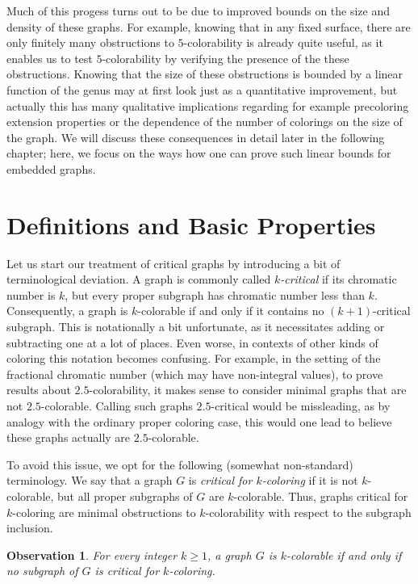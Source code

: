 \documentclass[12pt,twoside,openright,a4paper]{book}
\newtheorem{observation}[theorem]{Observation}
\begin{document}
Much of this progess turns out to be due to improved bounds
on the size and density of these graphs.  For example, knowing that in any
fixed surface, there are only finitely many obstructions to $5$-colorability
is already quite useful, as it enables us to test $5$-colorability by verifying the
presence of the these obstructions.  Knowing that the size of these obstructions
is bounded by a linear function of the genus may at first look just as a quantitative improvement,
but actually this has many qualitative implications regarding for example precoloring extension
properties or the dependence of the number of colorings on the size of the graph.
We will discuss these consequences in detail later in the following chapter;
here, we focus on the ways how one can prove such linear bounds for embedded graphs.

\section{Definitions and Basic Properties}

Let us start our treatment of critical graphs by introducing a bit of terminological
deviation.  A graph is commonly called \emph{$k$-critical} if its chromatic number is $k$, but every
proper subgraph has chromatic number less than $k$.  Consequently, a graph is $k$-colorable
if and only if it contains no $(k+1)$-critical subgraph.  This is notationally a bit unfortunate,
as it necessitates adding or subtracting one at a lot of places.  Even worse, in contexts
of other kinds of coloring this notation becomes confusing.  For example, in the setting
of the fractional chromatic number (which may have non-integral values), to prove results
about $2.5$-colorability, it makes sense to consider minimal graphs that are not $2.5$-colorable.
Calling such graphs $2.5$-critical would be missleading, as by analogy with the ordinary
proper coloring case, this would one lead to believe these graphs actually are $2.5$-colorable.

To avoid this issue, we opt for the following (somewhat non-standard) terminology.
We say that a graph $G$ is \emph{critical for $k$-coloring} if it is not $k$-colorable,
but all proper subgraphs of $G$ are $k$-colorable.  Thus, graphs critical for $k$-coloring
are minimal obstructions to $k$-colorability with respect to the subgraph inclusion.

\begin{observation}\label{obs:critsg}
For every integer $k\ge 1$, a graph $G$ is $k$-colorable if and only if no subgraph of $G$
is critical for $k$-coloring.
\end{observation}
\end{document}
